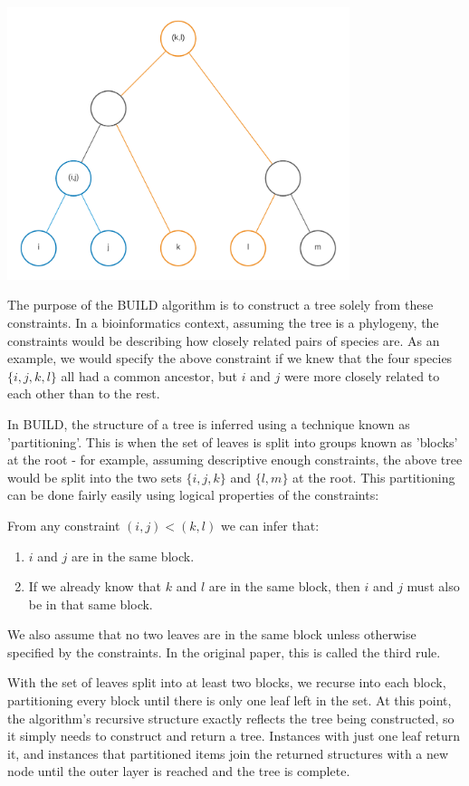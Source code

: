 \documentclass[11pt]{article} %
\begin{document}
\begin{center}
	\includegraphics[width=10cm]{buildexample}
\end{center}

The purpose of the BUILD algorithm is to construct a tree solely from these constraints. In a bioinformatics context, assuming the tree is a phylogeny, the constraints would be describing how closely related pairs of species are. As an example, we would specify the above constraint if we knew that the four species $\{i,j,k,l\}$ all had a common ancestor, but $i$ and $j$ were more closely related to each other than to the rest.

In BUILD, the structure of a tree is inferred using a technique known as 'partitioning'. This is when the set of leaves is split into groups known as 'blocks' at the root - for example, assuming descriptive enough constraints, the above tree would be split into the two sets $\{i,j,k\}$ and $\{l,m\}$ at the root. This partitioning can be done fairly easily using logical properties of the constraints:

From any constraint $(i,j)<(k,l)$ we can infer that:
\begin{enumerate}
	\item $i$ and $j$ are in the same block.
	\item If we already know that $k$ and $l$ are in the same block, then $i$ and $j$ must also be in that same block.
\end{enumerate}

We also assume that no two leaves are in the same block unless otherwise specified by the constraints. In the original paper, this is called the third rule.

With the set of leaves split into at least two blocks, we recurse into each block, partitioning every block until there is only one leaf left in the set. At this point, the algorithm's recursive structure exactly reflects the tree being constructed, so it simply needs to construct and return a tree. Instances with just one leaf return it, and instances that partitioned items join the returned structures with a new node until the outer layer is reached and the tree is complete.
\end{document}
